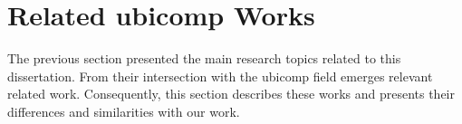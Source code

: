 \section{Related \acl{ubicomp} Works}
\label{sec:soa_ubicomp}

The previous section presented the main research topics related to this dissertation.
From their intersection with the \ac{ubicomp} field emerges relevant related work.
Consequently, this section describes these works and presents their differences and similarities with our work.





